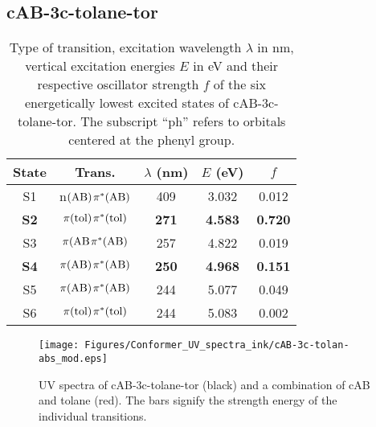 \subsection{cAB-3c-tolane-tor}
%
%
\begin{table}[H]
\caption{Type of transition, excitation wavelength $\lambda$ in nm, vertical excitation energies $E$ in eV and their respective oscillator strength $f$ of the six energetically lowest excited states of cAB-3c-tolane-tor. The subscript ``ph'' refers to orbitals centered at the phenyl group.}
\label{tab:excited_states_cAB_3c_tolane}
\vspace{0.1 cm}
\centering
\begin{tabular}{ccccc}
\toprule
State & Trans.&$\lambda$ (nm)  & $E$ (eV)               & $f$                 \\ 
\midrule
S1    & n$\mathrm{(AB)}\hspace{1 pt} \pi^{*}\mathrm{(AB)}$ & 409             & 3.032                  & 0.012               \\
\textbf{S2}    &$\pi\mathrm{(tol)}\hspace{1 pt} \pi^{*}\mathrm{(tol)}$ & \textbf{271}    & \textbf{4.583}         & \textbf{0.720}      \\
S3    &$\pi\mathrm{(AB}\hspace{1 pt} \pi^{*}\mathrm{(AB)}$ & 257             & 4.822                  & 0.019               \\
\textbf{S4}    &$\pi\mathrm{(AB)}\hspace{1 pt} \pi^{*}\mathrm{(AB)}$ & \textbf{250}    & \textbf{4.968}         & \textbf{0.151}      \\
S5    &$\pi\mathrm{(AB)}\hspace{1 pt} \pi^{*}\mathrm{(AB)}$ & 244             & 5.077                  & 0.049               \\
S6    &$\pi\mathrm{(tol)}\hspace{1 pt} \pi^{*}\mathrm{(tol)}$ & 244             & 5.083                  & 0.002               \\
\bottomrule
\end{tabular}
\end{table}
%
%
\begin{figure}[H]
    \centering
    \texttt{[image: Figures/Conformer\_UV\_spectra\_ink/cAB-3c-tolan-abs\_mod.eps]}
    \caption{UV spectra of cAB-3c-tolane-tor (black) and a combination of cAB and tolane (red). The bars signify the strength energy of the individual transitions.}
    \label{fig:UV_spec_cAB-for-tAB-3c-tolan}
\end{figure}
